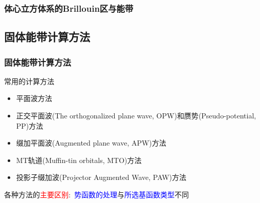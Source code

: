 {\frame
{
	\frametitle{体心立方体系的\textrm{Brillouin}区与能带}
\vspace{10pt}
\begin{figure}[h!]
\centering
\hspace*{-0.30in}
\label{Band_Gap_BCC_GeF4}
\end{figure}
}

\subsection{固体能带计算方法}
\frame
{
\frametitle{固体能带计算方法}
\vskip 10pt
常用的计算方法
\begin{itemize}%
\setlength{\itemsep}{12pt}
	\item	平面波方法
	\item	正交平面波\textrm{(The orthogonalized plane wave, OPW)}和赝势\textrm{(Pseudo-potential, PP)}方法
	\item	缀加平面波\textrm{(Augmented plane wave, APW)}方法
	\item	\textrm{MT}轨道\textrm{(Muffin-tin orbitals, MTO)}方法
	\item	投影子缀加波\textrm{(Projector Augmented Wave, PAW)}方法
\end{itemize}
\vskip 5pt 各种方法的\textcolor{red}{主要区别}:~\textcolor{blue}{势函数的处理}与\textcolor{blue}{所选基函数类型}不同
}

}
